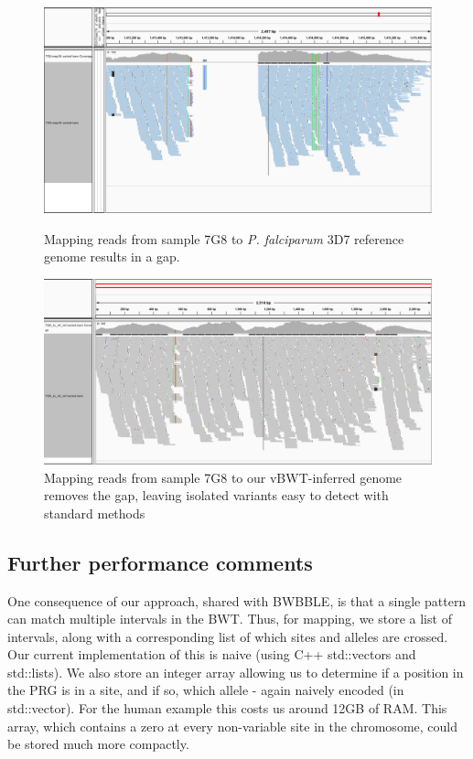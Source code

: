 \documentclass[runningheads,a4paper]{llncs}
\begin{document}
\begin{figure}[!tbp]
  \centering
  \begin{minipage}[b]{0.4\textwidth}
    \includegraphics[width=\textwidth]{7G8_to_3D7_pileup.png}
    \caption{Mapping reads from sample 7G8 to \textit{P. falciparum} 3D7 reference genome results in a gap.}
  \end{minipage}
  \hfill
  \begin{minipage}[b]{0.45\textwidth}
    \includegraphics[width=\textwidth]{7G8_to_inf_ref_pileup.png}
    \caption{Mapping reads from sample 7G8 to our vBWT-inferred genome removes the gap, leaving isolated variants easy to detect with standard methods }
  \end{minipage}
\end{figure}






\subsection{Further performance comments}
One  consequence of our approach, shared with BWBBLE, is that a single pattern can match multiple intervals in the BWT. Thus, for mapping, we store a list of intervals, along with a corresponding list of which sites and alleles are crossed. Our current implementation of this is naive (using C++ std::vectors and std::lists). We also store an integer array allowing us to determine if a position in the PRG is in a site, and if so, which allele - again naively encoded (in std::vector). For the human  example this costs us around 12GB of RAM. This  array, which contains a zero at every non-variable site in the chromosome, could be stored much more compactly.
\end{document}
